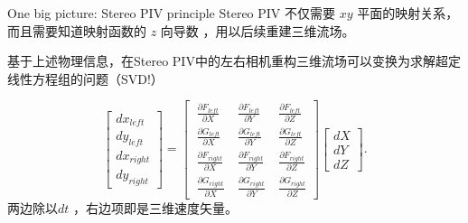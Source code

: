 \documentclass[10pt,xcolor={table,dvipsnames},t]{beamer}
\begin{document}
\begin{frame}{One big picture: Stereo PIV principle}
Stereo PIV 不仅需要 $xy$ 平面的映射关系，而且需要知道映射函数的 $z$ 向导数 ，用以后续重建三维流场。

基于上述物理信息，在Stereo PIV中的左右相机重构三维流场可以变换为求解超定线性方程组的问题（SVD!）

$$
\begin{bmatrix}
dx_{left} \\
dy_{left} \\
dx_{right} \\
dy_{right}
\end{bmatrix}
= 
\begin{bmatrix}
\displaystyle\ \frac{ \partial F_{left} }{ \partial X } & \displaystyle\ \frac{ \partial F_{left} }{ \partial Y } & \displaystyle\ \frac{ \partial F_{left} }{ \partial Z }  \\
\displaystyle\ \frac{ \partial G_{left} }{ \partial X } & \displaystyle\ \frac{ \partial G_{left} }{ \partial Y } & \displaystyle\ \frac{ \partial G_{left} }{ \partial Z }  \\
\displaystyle\ \frac{ \partial F_{right} }{ \partial X } & \displaystyle\ \frac{ \partial F_{right} }{ \partial Y } & \displaystyle\ \frac{ \partial F_{right} }{ \partial Z }  \\
\displaystyle\ \frac{ \partial G_{right} }{ \partial X } & \displaystyle\ \frac{ \partial G_{right} }{ \partial Y } & \displaystyle\ \frac{ \partial G_{right} }{ \partial Z }
\end{bmatrix}
\begin{bmatrix}
dX \\
dY \\
dZ
\end{bmatrix}.
$$
两边除以$dt$ ，右边项即是三维速度矢量。

\end{frame}
\end{document}
